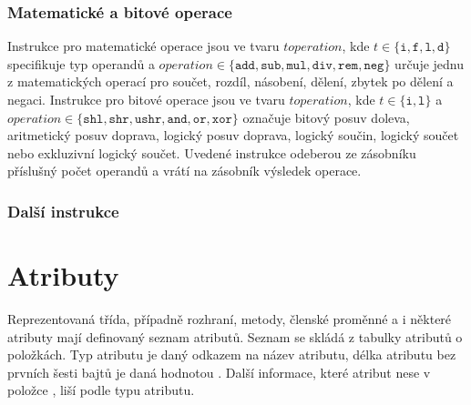 

\subsubsection{Matematické a bitové operace}

Instrukce pro matematické operace jsou ve tvaru $t operation$, 
kde $t \in \{\texttt{i},\texttt{f}, \texttt{l}, \texttt{d} \}$ specifikuje typ operandů 
a $operation \in \{\texttt{add},\texttt{sub}, \texttt{mul}, \texttt{div}, \texttt{rem}, \texttt{neg} \}$ určuje jednu z matematických operací pro součet, rozdíl, násobení, dělení, zbytek po dělení a negaci. 
Instrukce pro bitové operace jsou ve tvaru $t operation$, 
kde $t \in \{\texttt{i}, \texttt{l}\}$ 
a $operation \in \{\texttt{shl},\texttt{shr}, \texttt{ushr}, \texttt{and}, \texttt{or}, \texttt{xor}\}$ označuje bitový posuv doleva, aritmetický posuv doprava, logický posuv doprava, logický součin, logický součet nebo  exkluzivní logický součet. 
Uvedené instrukce odeberou ze zásobníku příslušný počet operandů a vrátí na zásobník výsledek operace.

\subsubsection{Další instrukce}












\section{Atributy}


Reprezentovaná třída, případně rozhraní, metody, členské proměnné a i některé atributy mají definovaný seznam atributů. Seznam se skládá z tabulky atributů  o  položkách. Typ atributu je daný odkazem  na název atributu, délka atributu bez prvních šesti bajtů je daná hodnotou . Další informace, které atribut nese v položce , liší podle typu atributu.

